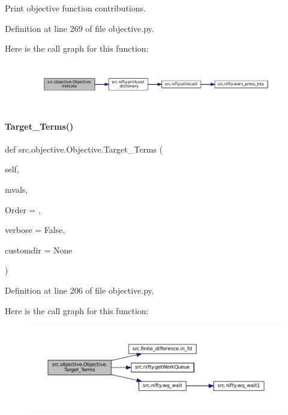 Print objective function contributions. 



Definition at line 269 of file objective.\+py.

Here is the call graph for this function\+:
\nopagebreak
\begin{figure}[H]
\begin{center}
\leavevmode
\includegraphics[width=350pt]{classsrc_1_1objective_1_1Objective_a18701bc88cb55e89b195a2dba2e6fca2_cgraph}
\end{center}
\end{figure}
\mbox{\label{classsrc_1_1objective_1_1Objective_a3e048f9ef39a1be74237d609ba012b32}} 
\paragraph{\texorpdfstring{Target\+\_\+\+Terms()}{Target\_Terms()}}
{\footnotesize\ttfamily def src.\+objective.\+Objective.\+Target\+\_\+\+Terms (\begin{DoxyParamCaption}\item[{}]{self,  }\item[{}]{mvals,  }\item[{}]{Order = {},  }\item[{}]{verbose = {\ttfamily False},  }\item[{}]{customdir = {\ttfamily None} }\end{DoxyParamCaption})}



Definition at line 206 of file objective.\+py.

Here is the call graph for this function\+:
\nopagebreak
\begin{figure}[H]
\begin{center}
\leavevmode
\includegraphics[width=350pt]{classsrc_1_1objective_1_1Objective_a3e048f9ef39a1be74237d609ba012b32_cgraph}
\end{center}
\end{figure}


